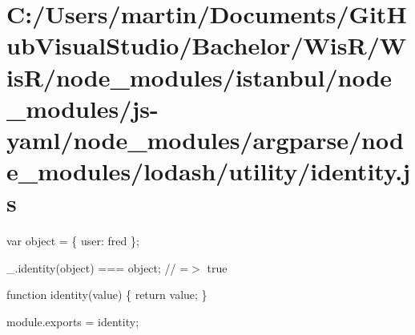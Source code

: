 \hypertarget{_c_1_2_users_2martin_2_documents_2_git_hub_visual_studio_2_bachelor_2_wis_r_2_wis_r_2node_module1c6ff0bc6da7fced4c6745dc552baba2}{}\section{C\+:/\+Users/martin/\+Documents/\+Git\+Hub\+Visual\+Studio/\+Bachelor/\+Wis\+R/\+Wis\+R/node\+\_\+modules/istanbul/node\+\_\+modules/js-\/yaml/node\+\_\+modules/argparse/node\+\_\+modules/lodash/utility/identity.\+js}
var object = \{ \textquotesingle{}user\textquotesingle{}\+: \textquotesingle{}fred\textquotesingle{} \};

\+\_\+.\+identity(object) === object; // =$>$ true


\begin{DoxyCodeInclude}

\textcolor{keyword}{function} identity(value) \{
  \textcolor{keywordflow}{return} value;
\}

module.exports = identity;
\end{DoxyCodeInclude}
 